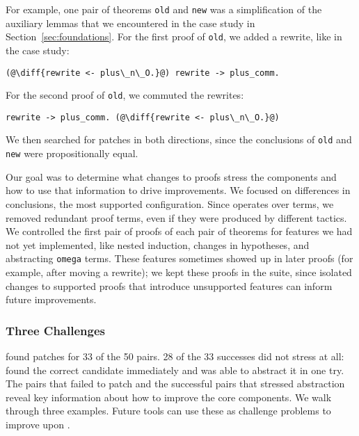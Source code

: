 For example, one pair of theorems \lstinline{old} and \lstinline{new} was a 
simplification of the auxiliary lemmas
that we encountered in the case study in Section~\ref{sec:foundations}.
For the first proof of \lstinline{old}, we added a rewrite, like in the case study:

\begin{lstlisting}[language=coq]
    (@\diff{rewrite <- plus\_n\_O.}@) rewrite -> plus_comm.
\end{lstlisting}

For the second proof of \lstinline{old}, we commuted the rewrites:

\begin{lstlisting}[language=coq]
    rewrite -> plus_comm. (@\diff{rewrite <- plus\_n\_O.}@)
\end{lstlisting} 

We then searched for patches in both directions,
since the conclusions of \lstinline{old}
and \lstinline{new} were propositionally equal.

Our goal was to determine what changes to proofs stress the components
and how to use that information to drive improvements.
We focused on differences in conclusions, the most supported configuration.
Since \sysname operates over terms,
we removed redundant proof terms, even if they were produced by different tactics.
We controlled the first pair of proofs of each pair of theorems for features we had not yet implemented,
like nested induction, changes in hypotheses, and abstracting \lstinline{omega} terms.
These features sometimes showed up in later proofs (for example, after moving a rewrite);
we kept these proofs in the suite, since isolated changes to supported proofs that
introduce unsupported features can inform future improvements.	

\subsubsection{Three Challenges}
\label{sec:fail}

\sysname found patches for 33 of the 50 pairs. 28 of the 33 successes
did not stress \sysname at all: \sysname found the correct candidate immediately and was able to abstract it
in one try.
The pairs that \sysname failed to patch and the successful pairs that stressed abstraction
reveal key information about how to improve the core components.
We walk through three examples.
Future tools can use these as challenge problems to improve upon \sysname.

